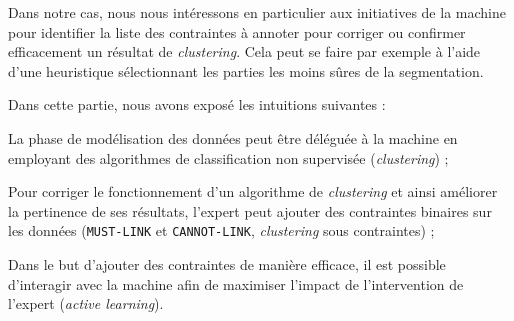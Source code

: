 		Dans notre cas, nous nous intéressons en particulier aux initiatives de la machine pour identifier la liste des contraintes à annoter pour corriger ou confirmer efficacement un résultat de \textit{clustering}.
		Cela peut se faire par exemple à l'aide d'une heuristique sélectionnant les parties les moins sûres de la segmentation.
	
	\begin{leftBarSummary}
		Dans cette partie, nous avons exposé les intuitions suivantes :
		\begin{todolist}
			\item[\itemok] La phase de modélisation des données peut être déléguée à la machine en employant des algorithmes de classification non supervisée (\textit{clustering}) ;
			\item[\itemok] Pour corriger le fonctionnement d'un algorithme de \textit{clustering} et ainsi améliorer la pertinence de ses résultats, l'expert peut ajouter des contraintes binaires sur les données (\texttt{MUST-LINK} et \texttt{CANNOT-LINK}, \textit{clustering} sous contraintes) ;
			\item[\itemok] Dans le but d'ajouter des contraintes de manière efficace, il est possible d'interagir avec la machine afin de maximiser l'impact de l'intervention de l'expert (\textit{active learning}).
		\end{todolist}
	\end{leftBarSummary}